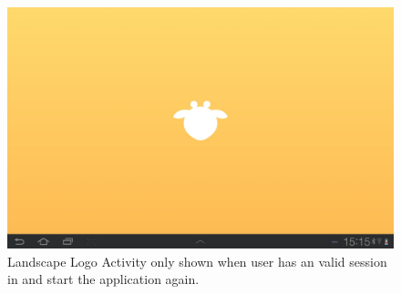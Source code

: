 \begin{figure}[h!]
	\centering
	\includegraphics[scale=0.3]{gfx/logo-activity_2.jpg}
	\caption{Landscape Logo Activity only shown when user has an valid session in and start the application again.}
	\label{fig:logo-activity_2}
\end{figure}
